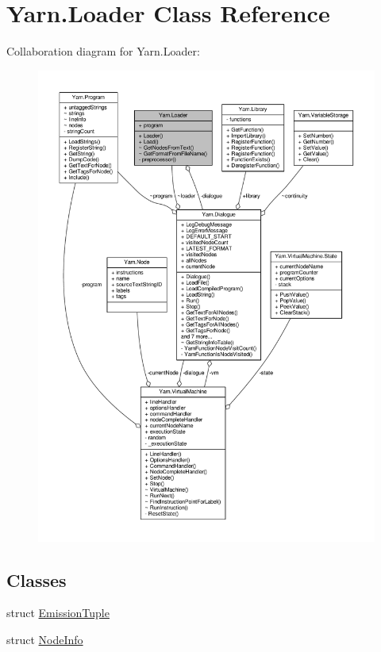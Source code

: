 \hypertarget{a00125}{\section{Yarn.\-Loader Class Reference}
\label{a00125}
}


Collaboration diagram for Yarn.\-Loader\-:
\nopagebreak
\begin{figure}[H]
\begin{center}
\leavevmode
\includegraphics[width=350pt]{a00614}
\end{center}
\end{figure}
\subsection*{Classes}
\begin{DoxyCompactItemize}
\item 
struct \hyperlink{a00093}{Emission\-Tuple}
\item 
struct \hyperlink{a00131}{Node\-Info}
\end{DoxyCompactItemize}
